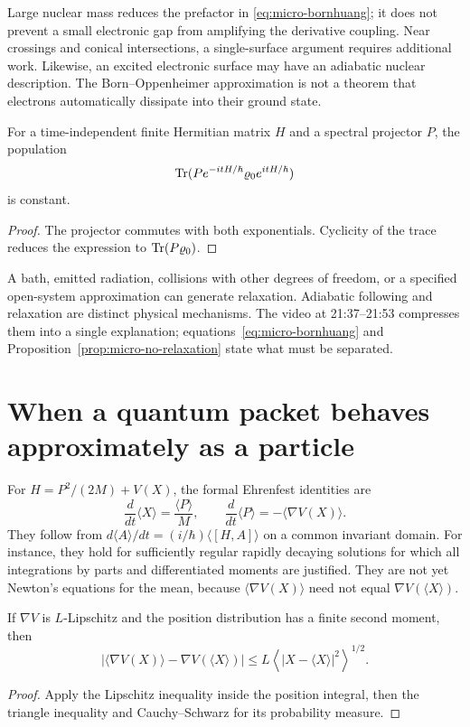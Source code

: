 Large nuclear mass reduces the prefactor in
\eqref{eq:micro-bornhuang}; it does not prevent a small electronic gap
from amplifying the derivative coupling.  Near crossings and conical
intersections, a single-surface argument requires additional work.
Likewise, an excited electronic surface may have an adiabatic nuclear
description.  The Born--Oppenheimer approximation is not a theorem that
electrons automatically dissipate into their ground state.

\begin{proposition}
\label{prop:micro-no-relaxation}
For a time-independent finite Hermitian matrix $H$ and a spectral
projector $P$, the population
\[
 \operatorname{Tr}(Pe^{-itH/\hbar}\varrho_0e^{itH/\hbar})
\]
is constant.
\end{proposition}
\begin{proof}
The projector commutes with both exponentials.  Cyclicity of the trace
reduces the expression to $\operatorname{Tr}(P\varrho_0)$.
\end{proof}

A bath, emitted radiation, collisions with other degrees of freedom, or
a specified open-system approximation can generate relaxation.
Adiabatic following and relaxation are distinct physical mechanisms.
The video at 21:37--21:53 compresses them into a single explanation;
equations~\eqref{eq:micro-bornhuang} and
Proposition~\ref{prop:micro-no-relaxation} state what must be separated.

\section{When a quantum packet behaves approximately as a particle}

For
$H=P^2/(2M)+V(X)$, the formal Ehrenfest identities are
\begin{equation}
 \frac{d}{dt}\langle X\rangle=\frac{\langle P\rangle}{M},
 \qquad
 \frac{d}{dt}\langle P\rangle=-\langle\nabla V(X)\rangle.
 \label{eq:micro-ehrenfest}
\end{equation}
They follow from $d\langle A\rangle/dt=(i/\hbar)\langle[H,A]\rangle$
on a common invariant domain.  For instance, they hold for sufficiently
regular rapidly decaying solutions for which all integrations by parts
and differentiated moments are justified.  They are not yet Newton's
equations for the mean, because
$\langle\nabla V(X)\rangle$ need not equal
$\nabla V(\langle X\rangle)$.

\begin{proposition}
\label{prop:micro-ehrenfest-error}
If $\nabla V$ is $L$-Lipschitz and the position distribution has a
finite second moment, then
\[
 \left|\langle\nabla V(X)\rangle-
       \nabla V(\langle X\rangle)\right|
 \le L\left\langle|X-\langle X\rangle|^2\right\rangle^{1/2}.
\]
\end{proposition}
\begin{proof}
Apply the Lipschitz inequality inside the position integral, then the
triangle inequality and Cauchy--Schwarz for its probability measure.
\end{proof}

